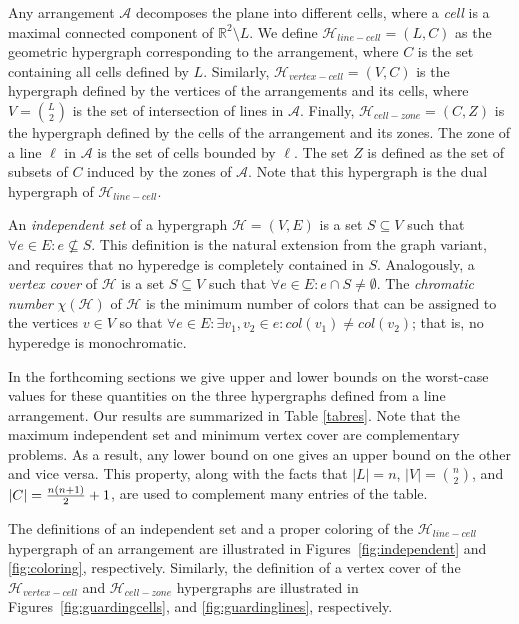 \documentclass[11pt,a4paper]{article}
\newcommand{\Hlinecell}{{\mathcal H}_{line-cell}}
\newcommand{\Hvertexcell}{{\mathcal H}_{vertex-cell}}
\newcommand{\Hcellzone}{{\mathcal H}_{cell-zone}}
\newcommand{\Hyper}{{\mathcal H}}
\begin{document}
Any arrangement $\mathcal{A}$ decomposes the plane into different cells, where a {\em cell} is a maximal connected component of $\mathbb{R}^2\setminus L$. We define $\Hlinecell = (L,C)$ as the geometric hypergraph corresponding to the arrangement, where $C$ is the set containing all cells defined by $L$. Similarly, $\Hvertexcell= (V,C)$ is the hypergraph defined by the vertices of the arrangements and its cells, where $V={L\choose 2}$ is the set of intersection of lines in $\mathcal{A}$. Finally, $\Hcellzone = (C, Z)$ is the hypergraph defined by the cells of the arrangement and its zones. The zone of a line $\ell$ in $\mathcal{A}$ is the set of cells bounded by $\ell$. The set $Z$ is defined as the set of subsets of $C$ induced by the zones of $\mathcal{A}$. Note that this hypergraph is the dual hypergraph of $\Hlinecell$.

An \emph{independent set} of a hypergraph $\Hyper = (V,E)$ is a set $S \subseteq V$ such that $\forall e \in E: e\not \subseteq S$. This definition is the natural extension from the graph variant, and requires that no hyperedge is completely contained in $S$. Analogously, a \emph{vertex cover} of $\Hyper$ is a set $S \subseteq V$ such that $\forall e \in E: e \cap S \neq \emptyset$. The \emph{chromatic number} $\chi(\Hyper)$ of $\Hyper$ is the minimum number of colors that can be assigned to the vertices $v \in V$ so that $\forall e \in E: \exists v_1, v_2 \in e : col(v_1) \neq col(v_2)$; that is, no hyperedge is monochromatic.

In the forthcoming sections we give upper and lower bounds on the worst-case values for these quantities on the three hypergraphs defined from a line arrangement. Our results are summarized in Table \ref{tabres}. Note that the maximum independent set and minimum vertex cover are complementary problems. As a result, any lower bound on one gives an upper bound on the other and vice versa. This property, along with the facts that $|L|=n$, $|V|={n\choose 2}$, and $|C|={{n(n+1) \over 2} +1}$, are used to complement many entries of the table. 



The definitions of an independent set and a proper coloring of the $\Hlinecell$ hypergraph of an arrangement are illustrated in Figures~\ref{fig:independent} and \ref{fig:coloring}, respectively. Similarly, the definition of a vertex cover of the $\Hvertexcell$
and $\Hcellzone$ hypergraphs are illustrated in Figures~\ref{fig:guardingcells}, and \ref{fig:guardinglines}, respectively.
\end{document}
